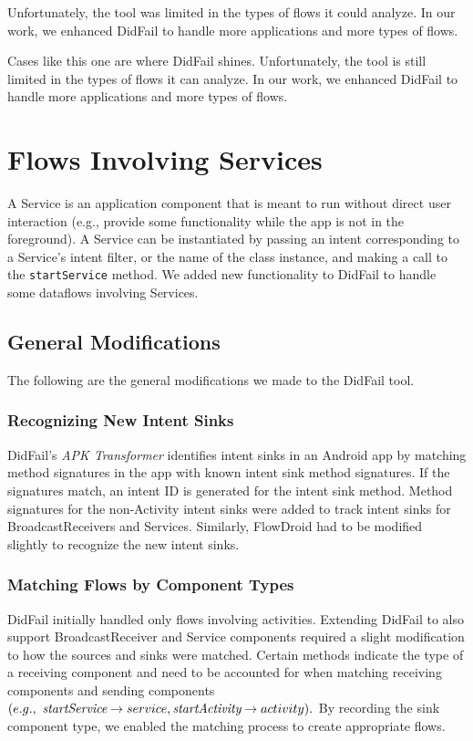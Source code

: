 Unfortunately, the tool was limited in the types of flows it could analyze. In our work, we enhanced DidFail to handle more applications and more types of flows.

Cases like this one are where DidFail shines. 
Unfortunately, the tool is still limited in the types of flows it can analyze. In our work, we enhanced DidFail to handle more applications and more types of flows.

\chapter{Flows Involving Services} \label{chap:services}
A Service is an application component that is meant to run without direct user interaction (e.g., provide some functionality while the app is not in the foreground). A Service can be instantiated by passing an intent corresponding to a Service's intent filter, or the name of the class instance, and making a call to the \texttt{startService} method. We added new functionality to DidFail to handle some dataflows involving Services.  

\section{General Modifications}
The following are the general modifications we made to the DidFail tool.
\subsection{Recognizing New Intent Sinks}
DidFail's \emph{APK Transformer} identifies intent sinks in an Android app by matching method signatures in the app with known intent sink method signatures. If the signatures match, an intent ID is generated for the intent sink method. Method signatures for the non-Activity intent sinks were added to track intent sinks for BroadcastReceivers and Services. Similarly, FlowDroid had to be modified slightly to recognize the new intent sinks. 

\subsection{Matching Flows by Component Types}
DidFail initially handled only flows involving activities. Extending DidFail to also support BroadcastReceiver and Service components required a slight modification to how the sources and sinks were matched. Certain methods indicate the type of a receiving component and need to be accounted for when matching receiving components and sending components $(e.g.,\  \emph{startService} \rightarrow service, \emph{startActivity} \rightarrow activity).$ By recording the sink component type, we enabled the matching process to create appropriate flows.

